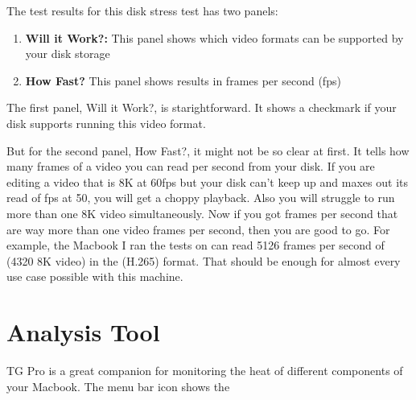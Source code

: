 \documentclass[a4paper]{article}
\begin{document}
The test results for this disk stress test has two panels:

\begin{enumerate}
    \item \textbf{Will it Work?:} This panel shows which video formats can be supported by your disk storage
    \item \textbf{How Fast?} This panel shows results in frames per second (fps)
\end{enumerate}

The first panel, Will it Work?, is starightforward. It shows a checkmark if your disk supports running this video format.

But for the second panel, How Fast?, it might not be so clear at first. It tells how many frames of a video you can read per second from your disk. If you are editing a video that is 8K at 60fps but your disk can't keep up and maxes out its read of fps at 50, you will get a choppy playback. Also you will struggle to run more than one 8K video simultaneously. Now if you got frames per second that are way more than one video frames per second, then you are good to go. For example, the Macbook I ran the tests on can read 5126 frames per second of (4320 8K video) in the (H.265) format. That should be enough for almost every use case possible with this machine.

\section{Analysis Tool}

TG Pro is a great companion for monitoring the heat of different components of your Macbook. The menu bar icon shows the 
\end{document}
